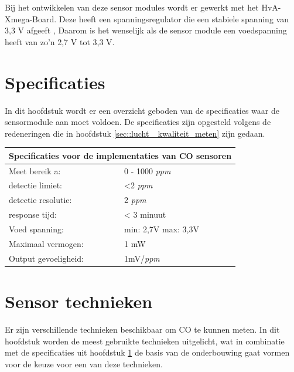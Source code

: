 \documentclass[a4paper, 11pt]{article} %
\begin{document}
	Bij het ontwikkelen van deze sensor modules wordt er gewerkt met het HvA-Xmega-Board. Deze heeft een spanningsregulator die een stabiele spanning van 3,3 V afgeeft \cite{xmega}, Daarom is het wenselijk als de sensor module een voedspanning heeft van zo'n 2,7 V tot 3,3 V.
	
	\section{Specificaties} \label{sec::specificaties}
	In dit hoofdstuk wordt er een overzicht geboden van de specificaties waar de sensormodule aan moet voldoen. De specificaties zijn opgesteld volgens de redeneringen die in hoofdstuk \ref{sec::lucht _kwaliteit_meten} zijn gedaan.
	\begin{center}
		\begin{tabular}{ | m{5cm} | m{5cm}| } 
			\hline
			\multicolumn{2}{|c|}{Specificaties voor de implementaties van CO sensoren} \\
			\hline
			Meet bereik a: & 0 - 1000 \textit{ppm} \\
			\hline
			detectie limiet:  & <2 \textit{ppm}
			\\ 
			\hline
			detectie resolutie: & 2 \textit{ppm} 
			\\ 
			\hline
			response tijd: & < 3 minuut
			\\ 
			\hline
			Voed spanning: & min: 2,7V max: 3,3V
			\\ 
			\hline
			Maximaal vermogen: & 1 mW
			\\
			\hline
			Output gevoeligheid: & 1mV/\textit{ppm}
			\\
			\hline
		\end{tabular}
	\end{center}
	
	\section{Sensor technieken} \label{sec::sensor_technieken}
	Er zijn verschillende technieken beschikbaar om CO te kunnen meten. In dit hoofdstuk worden de meest gebruikte technieken uitgelicht, wat in combinatie met de specificaties uit hoofdstuk \ref{sec::specificaties} de basis van de onderbouwing gaat vormen voor de keuze voor een van deze technieken.
	
\end{document}
